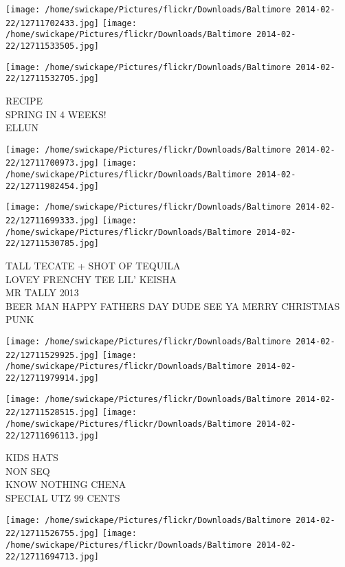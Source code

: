 \documentclass[10pt,letterpaper]{article}
\begin{document}
\texttt{[image: /home/swickape/Pictures/flickr/Downloads/Baltimore 2014-02-22/12711702433.jpg]}
\texttt{[image: /home/swickape/Pictures/flickr/Downloads/Baltimore 2014-02-22/12711533505.jpg]}

\vspace{0.25in}
\texttt{[image: /home/swickape/Pictures/flickr/Downloads/Baltimore 2014-02-22/12711532705.jpg]}

RECIPE\\
SPRING IN 4 WEEKS!\\
ELLUN\\
\pagebreak

\texttt{[image: /home/swickape/Pictures/flickr/Downloads/Baltimore 2014-02-22/12711700973.jpg]}
\texttt{[image: /home/swickape/Pictures/flickr/Downloads/Baltimore 2014-02-22/12711982454.jpg]}

\texttt{[image: /home/swickape/Pictures/flickr/Downloads/Baltimore 2014-02-22/12711699333.jpg]}
\texttt{[image: /home/swickape/Pictures/flickr/Downloads/Baltimore 2014-02-22/12711530785.jpg]}

TALL TECATE + SHOT OF TEQUILA\\
LOVEY FRENCHY TEE LIL' KEISHA\\
MR TALLY 2013\\
BEER MAN HAPPY FATHERS DAY DUDE SEE YA MERRY CHRISTMAS PUNK\\
\pagebreak

\texttt{[image: /home/swickape/Pictures/flickr/Downloads/Baltimore 2014-02-22/12711529925.jpg]}
\texttt{[image: /home/swickape/Pictures/flickr/Downloads/Baltimore 2014-02-22/12711979914.jpg]}

\texttt{[image: /home/swickape/Pictures/flickr/Downloads/Baltimore 2014-02-22/12711528515.jpg]}
\texttt{[image: /home/swickape/Pictures/flickr/Downloads/Baltimore 2014-02-22/12711696113.jpg]}

KIDS HATS\\
NON SEQ\\
KNOW NOTHING CHENA\\
SPECIAL UTZ 99 CENTS\\
\pagebreak

\texttt{[image: /home/swickape/Pictures/flickr/Downloads/Baltimore 2014-02-22/12711526755.jpg]}
\texttt{[image: /home/swickape/Pictures/flickr/Downloads/Baltimore 2014-02-22/12711694713.jpg]}
\end{document}
